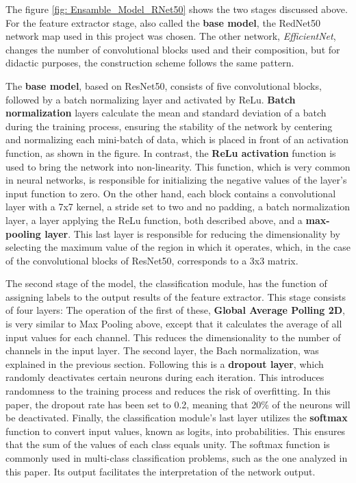 The figure \ref{fig: Ensamble_Model_RNet50} shows the two stages discussed above. For the feature extractor stage, also called the \textbf{base model}, the RedNet50 network map used in this project was chosen. The other network, \textit{EfficientNet}, changes the number of convolutional blocks used and their composition, but for didactic purposes, the construction scheme follows the same pattern. 

The \textbf{base model}, based on ResNet50, consists of five convolutional blocks, followed by a batch normalizing layer and activated by ReLu. \textbf{Batch normalization} layers calculate the mean and standard deviation of a batch during the training process, ensuring the stability of the network by centering and normalizing each mini-batch of data, which is placed in front of an activation function, as shown in the figure. In contrast, the \textbf{ReLu activation} function is used to bring the network into non-linearity. This function, which is very common in neural networks, is responsible for initializing the negative values of the layer's input function to zero. On the other hand, each block contains a convolutional layer with a 7x7 kernel, a stride set to two and no padding, a batch normalization layer, a layer applying the ReLu function, both described above, and a \textbf{max-pooling layer}. This last layer is responsible for reducing the dimensionality by selecting the maximum value of the region in which it operates, which, in the case of the convolutional blocks of ResNet50, corresponds to a 3x3 matrix.

The second stage of the model, the classification module, has the function of assigning labels to the output results of the feature extractor. This stage consists of four layers: The operation of the first of these, \textbf{Global Average Polling 2D}, is very similar to Max Pooling above, except that it calculates the average of all input values for each channel. This reduces the dimensionality to the number of channels in the input layer. The second layer, the Bach normalization, was explained in the previous section. Following this is a \textbf{dropout layer}, which randomly deactivates certain neurons during each iteration. This introduces randomness to the training process and reduces the risk of overfitting. In this paper, the dropout rate has been set to 0.2, meaning that 20\% of the neurons will be deactivated. Finally, the classification module's last layer utilizes the \textbf{softmax} function to convert input values, known as logits, into probabilities. This ensures that the sum of the values of each class equals unity. The softmax function is commonly used in multi-class classification problems, such as the one analyzed in this paper. Its output facilitates the interpretation of the network output.

